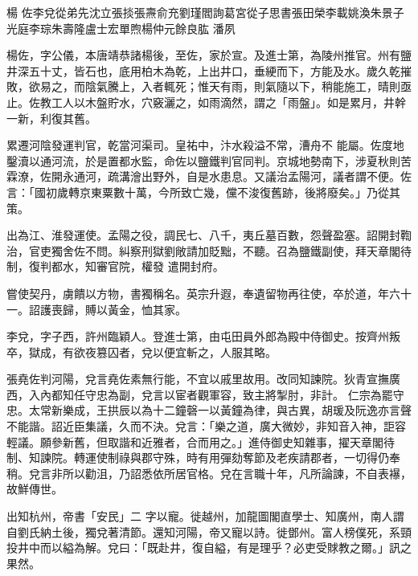 
\begin{pinyinscope}

 楊
 佐李兌從弟先沈立張掞張燾俞充劉瑾閻詢葛宮從子思書張田榮李載姚渙朱景子光庭李琮朱壽隆盧士宏單煦楊仲元餘良肱
 潘夙



 楊佐，字公儀，本唐靖恭諸楊後，至佐，家於宣。及進士第，為陵州推官。州有鹽井深五十丈，皆石也，底用柏木為乾，上出井口，垂綆而下，方能及水。歲久乾摧敗，欲易之，而陰氣騰上，入者輒死；惟天有雨，則氣隨以下，稍能施工，晴則亟止。佐教工人以木盤貯水，穴竅灑之，如雨滴然，謂之「雨盤」。如是累月，井幹一新，利復其舊。



 累遷河陰發運判官，乾當河渠司。皇祐中，汴水殺溢不常，漕舟不
 能屬。佐度地鑿瀆以通河流，於是置都水監，命佐以鹽鐵判官同判。京城地勢南下，涉夏秋則苦霖潦，佐開永通河，疏溝澮出野外，自是水患息。又議治孟陽河，議者謂不便。佐言：「國初歲轉京東粟數十萬，今所致亡幾，儻不浚復舊跡，後將廢矣。」乃從其策。



 出為江、淮發運使。孟陽之役，調民七、八千，夷丘墓百數，怨聲盈塞。詔開封鞫治，官吏獨舍佐不問。糾察刑獄劉敞請加貶黜，不聽。召為鹽鐵副使，拜天章閣待制，復判都水，知審官院，權發
 遣開封府。



 嘗使契丹，虜饋以方物，書獨稱名。英宗升遐，奉遺留物再往使，卒於道，年六十一。詔護喪歸，賻以黃金，恤其家。



 李兌，字子西，許州臨穎人。登進士第，由屯田員外郎為殿中侍御史。按齊州叛卒，獄成，有欲夜篡囚者，兌以便宜斬之，人服其略。



 張堯佐判河陽，兌言堯佐素無行能，不宜以戚里故用。改同知諫院。狄青宣撫廣西，入內都知任守忠為副，兌言以宦者觀軍容，致主將掣肘，非計。
 仁宗為罷守忠。太常新樂成，王拱辰以為十二鐘磬一以黃鐘為律，與古異，胡瑗及阮逸亦言聲不能諧。詔近臣集議，久而不決。兌言：「樂之道，廣大微妙，非知音入神，詎容輕議。願參新舊，但取諧和近雅者，合而用之。」進侍御史知雜事，擢天章閣待制、知諫院。轉運使制祿與郡守殊，時有用彈劾奪節及老疾請郡者，一切得仍奉稍。兌言非所以勸沮，乃詔悉依所居官格。兌在言職十年，凡所論諫，不自表襮，故鮮傳世。



 出知杭州，帝書「安民」二
 字以寵。徙越州，加龍圖閣直學士、知廣州，南人謂自劉氏納土後，獨兌著清節。還知河陽，帝又寵以詩。徙鄧州。富人榜僕死，系頸投井中而以縊為解。兌曰：「既赴井，復自縊，有是理乎？必吏受賕教之爾。」訊之果然。




\end{pinyinscope}
